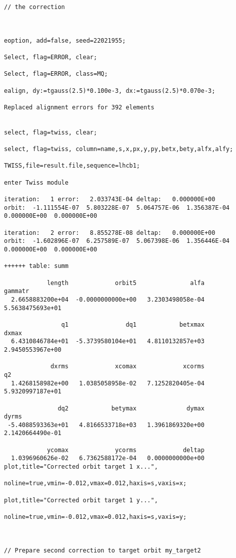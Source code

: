 \begin{verbatim}
// the correction



eoption, add=false, seed=22021955;

Select, flag=ERROR, clear;

Select, flag=ERROR, class=MQ;

ealign, dy:=tgauss(2.5)*0.100e-3, dx:=tgauss(2.5)*0.070e-3;

Replaced alignment errors for 392 elements


select, flag=twiss, clear;

select, flag=twiss, column=name,s,x,px,y,py,betx,bety,alfx,alfy;

TWISS,file=result.file,sequence=lhcb1; 

enter Twiss module
  
iteration:   1 error:   2.033743E-04 deltap:   0.000000E+00
orbit:  -1.111554E-07  5.803228E-07  5.064757E-06  1.356387E-04  0.000000E+00  0.000000E+00
  
iteration:   2 error:   8.855278E-08 deltap:   0.000000E+00
orbit:  -1.602896E-07  6.257589E-07  5.067398E-06  1.356446E-04  0.000000E+00  0.000000E+00

++++++ table: summ

            length             orbit5               alfa            gammatr 
  2.6658883200e+04  -0.0000000000e+00   3.2303498058e-04   5.5638475693e+01 

                q1                dq1            betxmax              dxmax 
  6.4310846784e+01  -5.3739580104e+01   4.8110132857e+03   2.9450553967e+00 

             dxrms             xcomax             xcorms                 q2 
  1.4268158982e+00   1.0385058958e-02   7.1252820405e-04   5.9320997187e+01 

               dq2            betymax              dymax              dyrms 
 -5.4088593363e+01   4.8166533718e+03   1.3961869320e+00   2.1420664490e-01 

            ycomax             ycorms             deltap 
  1.0396960626e-02   6.7362588172e-04   0.0000000000e+00 
plot,title="Corrected orbit target 1 x...",

noline=true,vmin=-0.012,vmax=0.012,haxis=s,vaxis=x;

plot,title="Corrected orbit target 1 y...",

noline=true,vmin=-0.012,vmax=0.012,haxis=s,vaxis=y;



// Prepare second correction to target orbit my_target2




\end{verbatim}

